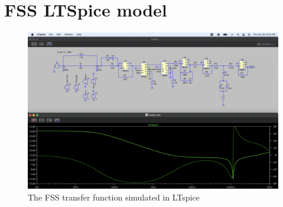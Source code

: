 \section{FSS LTSpice model}

\begin{figure}[H]
\includegraphics[width=\textwidth]{figs/ALGAAS/spice_FSS_tf.png}
\caption{The FSS transfer function simulated in LTspice}
\label{fig:spiceFSS}
\end{figure}
